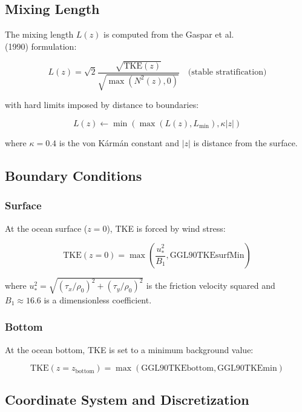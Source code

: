\documentclass[12pt,letterpaper]{article}
\newcommand{\TKE}{\mathrm{TKE}}
\newcommand{\Nsq}{N^2}
\begin{document}
\subsection{Mixing Length}

The mixing length $L(z)$ is computed from the Gaspar et al.\\ (1990) formulation:

\begin{equation}
L(z) = \sqrt{2} \frac{\sqrt{\TKE(z)}}{\sqrt{\max(\Nsq(z), 0)}}
\quad \text{(stable stratification)}
\end{equation}

with hard limits imposed by distance to boundaries:

\begin{equation}
L(z) \leftarrow \min\left(\max\left(L(z), L_{\min}\right), \kappa |z|\right)
\end{equation}

where $\kappa = 0.4$ is the von Kármán constant and $|z|$ is distance from the surface.

\subsection{Boundary Conditions}

\subsubsection{Surface}
At the ocean surface ($z=0$), TKE is forced by wind stress:

\begin{equation}
\TKE(z=0) = \max\left(\frac{u_*^2}{B_1}, \text{GGL90TKEsurfMin}\right)
\end{equation}

where $u_*^2 = \sqrt{(\tau_x/\rho_0)^2 + (\tau_y/\rho_0)^2}$ is the friction velocity squared and $B_1 \approx 16.6$ is a dimensionless coefficient.

\subsubsection{Bottom}
At the ocean bottom, TKE is set to a minimum background value:

\begin{equation}
\TKE(z=z_{\text{bottom}}) = \max\left(\text{GGL90TKEbottom}, \text{GGL90TKEmin}\right)
\end{equation}

\subsection{Coordinate System and Discretization}
\end{document}
